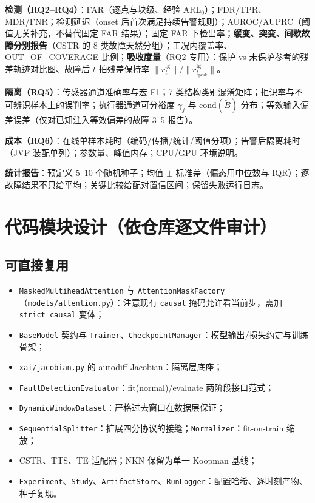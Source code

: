 \documentclass[11pt,a4paper]{ctexart}
\theoremstyle{remark}
\begin{document}
\textbf{检测（RQ2--RQ4）}：FAR（逐点与块级、经验 ARL$_0$）；FDR/TPR、MDR/FNR；检测延迟（onset 后首次满足持续告警规则）；AUROC/AUPRC（阈值无关补充，不替代固定 FAR 结果）；固定 FAR 下检出率；\textbf{缓变、突变、间歇故障分别报告}（CSTR 的 8 类故障天然分组）；工况内覆盖率、OUT\_OF\_COVERAGE 比例；\textbf{吸收度量}（RQ2 专用）：保护 vs 未保护参考的残差轨迹对比图、故障后 $t$ 拍残差保持率 $\|r^{\mathrm{lg}}_{t}\|/\|r^{\mathrm{lg}}_{t_{\mathrm{peak}}}\|$。

\textbf{隔离（RQ5）}：传感器通道准确率与宏 F1；7 类结构类别混淆矩阵；拒识率与不可辨识样本上的误判率；执行器通道可分裕度 $\gamma_j$ 与 $\mathrm{cond}(\tilde B)$ 分布；等效输入偏差误差（仅对已知注入等效偏差的故障 3--5 报告）。

\textbf{成本（RQ6）}：在线单样本耗时（编码/传播/统计/阈值分项）；告警后隔离耗时（JVP 装配单列）；参数量、峰值内存；CPU/GPU 环境说明。

\textbf{统计报告}：预定义 5--10 个随机种子；均值 $\pm$ 标准差（偏态用中位数与 IQR）；逐故障结果不只给平均；关键比较给配对置信区间；保留失败运行日志。

\section{代码模块设计（依仓库逐文件审计）}

\subsection{可直接复用}

\begin{itemize}
\item \texttt{MaskedMultiheadAttention} 与 \texttt{AttentionMaskFactory}（\texttt{models/attention.py}）：注意现有 \texttt{causal} 掩码允许看当前步，需加 \texttt{strict\_causal} 变体；
\item \texttt{BaseModel} 契约与 \texttt{Trainer}、\texttt{CheckpointManager}：模型输出/损失约定与训练骨架；
\item \texttt{xai/jacobian.py} 的 autodiff Jacobian：隔离层底座；
\item \texttt{FaultDetectionEvaluator}：fit(normal)/evaluate 两阶段接口范式；
\item \texttt{DynamicWindowDataset}：严格过去窗口在数据层保证；
\item \texttt{SequentialSplitter}：扩展四分协议的接缝；\texttt{Normalizer}：fit-on-train 缩放；
\item CSTR、TTS、TE 适配器；NKN 保留为单一 Koopman 基线；
\item \texttt{Experiment}、\texttt{Study}、\texttt{ArtifactStore}、\texttt{RunLogger}：配置哈希、逐时刻产物、种子复现。
\end{itemize}
\end{document}
